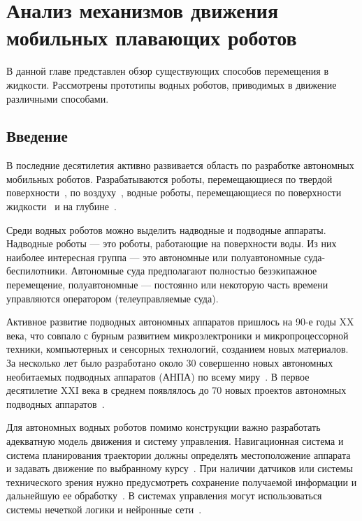 \chapter{Анализ механизмов движения мобильных плавающих роботов}\label{ch:ch1}

В данной главе представлен обзор существующих способов перемещения в жидкости. Рассмотрены прототипы водных роботов, приводимых в движение различными способами. 

\section{Введение}\label{sec:ch1/sec1}

В последние десятилетия активно развивается область по разработке автономных мобильных роботов. %
Разрабатываются роботы, перемещающиеся по твердой поверхности~\cite{Lozano_2012, Domel_2017, Kilin_et_al_2017, Bozek_2020}, по воздуху~\cite{Kim_2008, Miller_2007}, водные роботы, перемещающиеся по поверхности жидкости~\cite{Pshihopov_2014, Moreira_2011} и на глубине~\cite{Pshihopov_2014, Gornak_MMT3000, Matvienko_2017}. 

Среди водных роботов можно выделить надводные и подводные аппараты. Надводные роботы --- это роботы, работающие на поверхности воды. Из них наиболее интересная группа --- это автономные или полуавтономные суда-беспилотники. Автономные суда предполагают полностью безэкипажное перемещение, полуавтономные --- постоянно или некоторую часть времени управляются оператором (телеуправляемые суда).

Активное развитие подводных автономных аппаратов пришлось на 90-е годы XX века, что совпало с бурным развитием микроэлектроники и микропроцессорной техники, компьютерных и сенсорных технологий, созданием новых материалов. За несколько лет было разработано около 30 совершенно новых автономных необитаемых подводных аппаратов (АНПА) по всему миру~\cite{Yuh_2000}. В первое десятилетие XXI века в среднем появлялось до 70 новых проектов автономных подводных аппаратов~\cite{Bocharov_2009}.

Для автономных водных роботов помимо конструкции важно разработать адекватную модель движения и систему управления. Навигационная система и система планирования траектории должны определять местоположение аппарата и задавать движение по выбранному курсу~\cite{Fiorelli_2006, Lapierre_2007, Burdinskiy_2012}. При наличии датчиков или системы технического зрения нужно предусмотреть сохранение получаемой информации и дальнейшую ее обработку~\cite{Huster_2001, Dunbabin_2006}. В системах управления могут использоваться системы нечеткой логики и нейронные сети~\cite{Tenenev_2010, Loebis_2004, Ishii_1995, Xiang_2017, Zhang_2008}.

